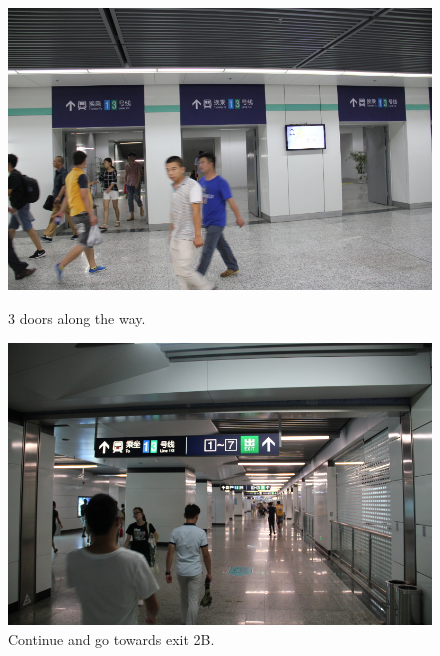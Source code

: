 \documentclass[11pt]{article}
\begin{document}
 \begin{figure}[!h]
	\begin{minipage}[t]{.5\textwidth}
     	\centering
        	\includegraphics[scale=0.27]{IMG_7179.jpg}
		\caption{3 doors along the way.\label{IMG_7179}}
	\end{minipage}%
     \begin{minipage}[t]{.5\textwidth}
         \centering
       	 \includegraphics[scale=0.27]{IMG_7180.jpg}
		\caption{Continue and go towards exit 2B.\label{IMG_7180}}
    \end{minipage}%
 \end{figure}
\end{document}

